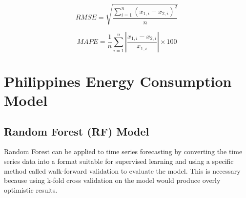 \documentclass[runningheads]{llncs}
\begin{document}
\begin{equation}
    RMSE = \sqrt{\frac{\sum_{i=1}^{n}(x_{1,i} - x_{2,i})^2}{n}}  
\end{equation}

\begin{equation}
    MAPE = \frac{1}{n}\sum_{i=1}^{n}\left | \frac{x_{1,i} - x_{2,i}}{x_{1,i}} \right | \times 100
\end{equation}

\section{Philippines Energy Consumption Model}
\subsection{Random Forest (RF) Model}
Random Forest can be applied to time series forecasting by converting the time series data into a format suitable for supervised learning and using a specific method called walk-forward validation to evaluate the model. This is necessary because using k-fold cross validation on the model would produce overly optimistic results.
\end{document}
